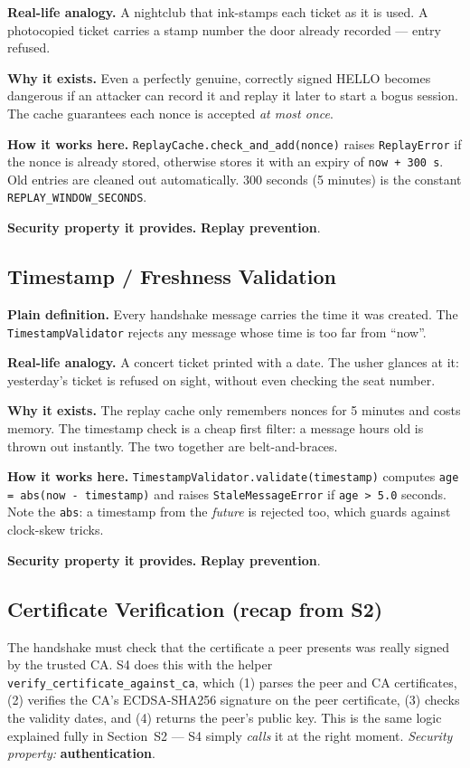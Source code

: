 \documentclass[11pt,a4paper]{report}
\begin{document}
\textbf{Real-life analogy.} A nightclub that ink-stamps each ticket as it is
used. A photocopied ticket carries a stamp number the door already recorded ---
entry refused.

\textbf{Why it exists.} Even a perfectly genuine, correctly signed HELLO becomes
dangerous if an attacker can record it and replay it later to start a bogus
session. The cache guarantees each nonce is accepted \emph{at most once}.

\textbf{How it works here.} \texttt{ReplayCache.check\_and\_add(nonce)} raises
\texttt{ReplayError} if the nonce is already stored, otherwise stores it with an
expiry of \texttt{now + 300\,s}. Old entries are cleaned out automatically. 300
seconds (5 minutes) is the constant \texttt{REPLAY\_WINDOW\_SECONDS}.

\textbf{Security property it provides.} \textbf{Replay prevention}.

\subsection{Timestamp / Freshness Validation}
\textbf{Plain definition.} Every handshake message carries the time it was
created. The \texttt{TimestampValidator} rejects any message whose time is too
far from ``now''.

\textbf{Real-life analogy.} A concert ticket printed with a date. The usher
glances at it: yesterday's ticket is refused on sight, without even checking the
seat number.

\textbf{Why it exists.} The replay cache only remembers nonces for 5 minutes and
costs memory. The timestamp check is a cheap first filter: a message hours old is
thrown out instantly. The two together are belt-and-braces.

\textbf{How it works here.} \texttt{TimestampValidator.validate(timestamp)}
computes \texttt{age = abs(now - timestamp)} and raises \texttt{StaleMessageError}
if \texttt{age > 5.0} seconds. Note the \texttt{abs}: a timestamp from the
\emph{future} is rejected too, which guards against clock-skew tricks.

\textbf{Security property it provides.} \textbf{Replay prevention}.

\subsection{Certificate Verification (recap from S2)}
The handshake must check that the certificate a peer presents was really signed
by the trusted CA. S4 does this with the helper
\texttt{verify\_certificate\_against\_ca}, which (1) parses the peer and CA
certificates, (2) verifies the CA's ECDSA-SHA256 signature on the peer
certificate, (3) checks the validity dates, and (4) returns the peer's public
key. This is the same logic explained fully in Section~S2 ---
S4 simply \emph{calls} it at the right moment. \emph{Security property:}
\textbf{authentication}.
\end{document}
